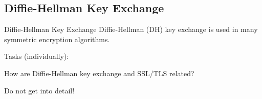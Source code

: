 ﻿\subsection{Diffie-Hellman Key Exchange}

\begin{frame}{Diffie-Hellman Key Exchange}
  \alert{Diffie-Hellman (DH)} key exchange is used in many \alert{symmetric} encryption algorithms.
  \begin{exampleblock}{Tasks (individually):}
    \begin{description}[???]
        \item [???] How are \alert{Diffie-Hellman} key exchange and SSL/TLS related?
        \begin{description}
            \item [$\Rightarrow$ Hint:] Do not get into detail!
        \end{description}
    \end{description}
  \end{exampleblock}
\end{frame}
